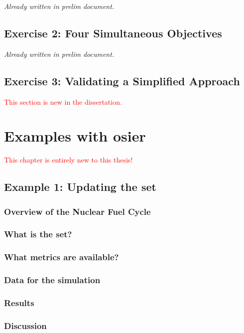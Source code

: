 \textit{Already written in prelim document.}

\section{Exercise 2: Four Simultaneous Objectives}

\textit{Already written in prelim document.}

\section{Exercise 3: Validating a Simplified Approach}

\textcolor{red}{This section is new in the dissertation.}

\chapter{Examples with \acs{osier}}
\label{chapter:examples}

\textcolor{red}{This chapter is entirely new to this thesis!}

\section{Example 1: Updating the \ac{set}}

\subsection{Overview of the Nuclear Fuel Cycle}

\subsection{What is the \ac{set}?}

\subsection{What metrics are available?}

\subsection{Data for the simulation}

\subsection{Results}

\subsection{Discussion}

